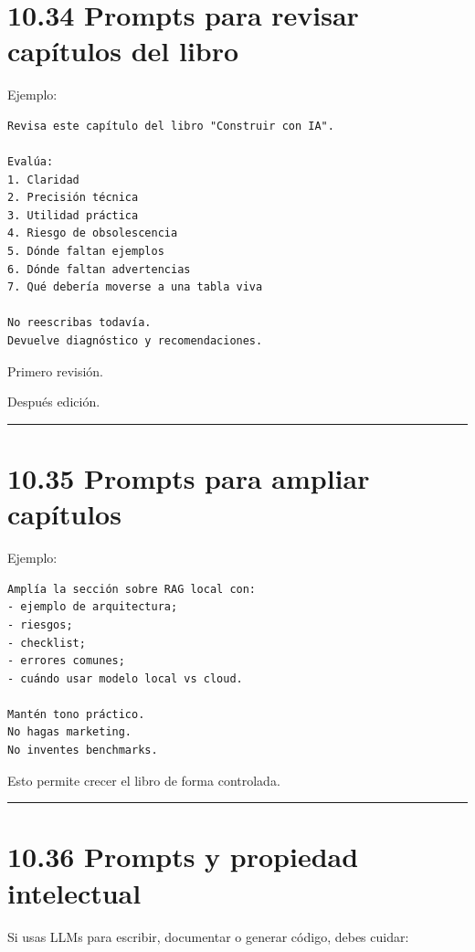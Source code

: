 \section{10.34 Prompts para revisar capítulos del
libro}\label{prompts-para-revisar-capuxedtulos-del-libro}

Ejemplo:

\begin{lstlisting}
Revisa este capítulo del libro "Construir con IA".

Evalúa:
1. Claridad
2. Precisión técnica
3. Utilidad práctica
4. Riesgo de obsolescencia
5. Dónde faltan ejemplos
6. Dónde faltan advertencias
7. Qué debería moverse a una tabla viva

No reescribas todavía.
Devuelve diagnóstico y recomendaciones.
\end{lstlisting}

Primero revisión.

Después edición.

\begin{center}\rule{0.5\linewidth}{0.5pt}\end{center}

\section{10.35 Prompts para ampliar
capítulos}\label{prompts-para-ampliar-capuxedtulos}

Ejemplo:

\begin{lstlisting}
Amplía la sección sobre RAG local con:
- ejemplo de arquitectura;
- riesgos;
- checklist;
- errores comunes;
- cuándo usar modelo local vs cloud.

Mantén tono práctico.
No hagas marketing.
No inventes benchmarks.
\end{lstlisting}

Esto permite crecer el libro de forma controlada.

\begin{center}\rule{0.5\linewidth}{0.5pt}\end{center}

\section{10.36 Prompts y propiedad
intelectual}\label{prompts-y-propiedad-intelectual}

Si usas LLMs para escribir, documentar o generar código, debes cuidar:

